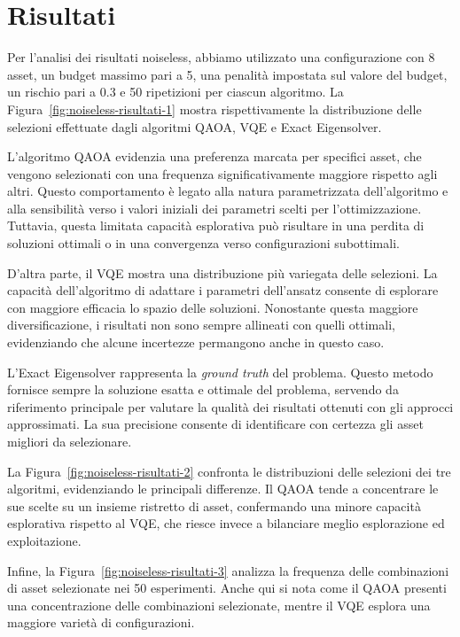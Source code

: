 \section{Risultati}\label{sec:results}

Per l'analisi dei risultati noiseless, abbiamo utilizzato una configurazione con 
8 asset, un budget massimo pari a 5, una penalità impostata sul valore del budget, 
un rischio pari a 0.3 e 50 ripetizioni per ciascun algoritmo. 
La Figura~\ref{fig:noiseless-risultati-1} mostra rispettivamente la distribuzione 
delle selezioni effettuate dagli algoritmi QAOA, VQE e Exact Eigensolver.

L'algoritmo QAOA evidenzia una preferenza marcata per specifici asset, che vengono 
selezionati con una frequenza significativamente maggiore rispetto agli altri. 
Questo comportamento è legato alla natura parametrizzata dell'algoritmo e alla 
sensibilità verso i valori iniziali dei parametri scelti per l'ottimizzazione. 
Tuttavia, questa limitata capacità esplorativa può risultare in una perdita di 
soluzioni ottimali o in una convergenza verso configurazioni subottimali.

D'altra parte, il VQE mostra una distribuzione più variegata delle selezioni. 
La capacità dell'algoritmo di adattare i parametri dell'ansatz consente di 
esplorare con maggiore efficacia lo spazio delle soluzioni. Nonostante questa 
maggiore diversificazione, i risultati non sono sempre allineati con quelli 
ottimali, evidenziando che alcune incertezze permangono anche in questo caso.

L'Exact Eigensolver rappresenta la \textit{ground truth} del problema. Questo 
metodo fornisce sempre la soluzione esatta e ottimale del problema, servendo 
da riferimento principale per valutare la qualità dei risultati ottenuti con 
gli approcci approssimati. La sua precisione consente di identificare con 
certezza gli asset migliori da selezionare.

La Figura~\ref{fig:noiseless-risultati-2} confronta le distribuzioni delle 
selezioni dei tre algoritmi, evidenziando le principali differenze. Il QAOA 
tende a concentrare le sue scelte su un insieme ristretto di asset, 
confermando una minore capacità esplorativa rispetto al VQE, che riesce 
invece a bilanciare meglio esplorazione ed exploitazione.

Infine, la Figura~\ref{fig:noiseless-risultati-3} analizza la frequenza 
delle combinazioni di asset selezionate nei 50 esperimenti. Anche qui 
si nota come il QAOA presenti una concentrazione delle combinazioni 
selezionate, mentre il VQE esplora una maggiore varietà di configurazioni. 

